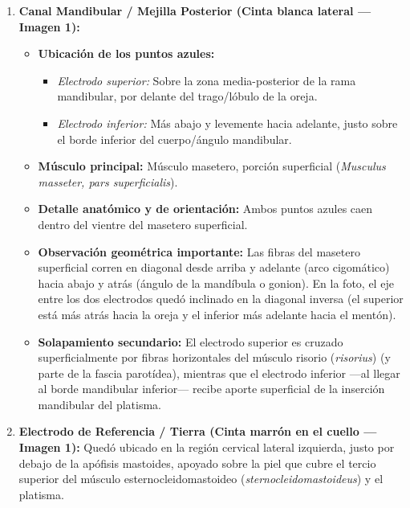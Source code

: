 \documentclass[11pt,a4paper]{article}
\begin{document}
\begin{enumerate}
    \item \textbf{Canal Mandibular / Mejilla Posterior (Cinta blanca lateral — Imagen 1):}
    \begin{itemize}
        \item \textbf{Ubicación de los puntos azules:}
        \begin{itemize}
            \item \textit{Electrodo superior:} Sobre la zona media-posterior de la rama mandibular, por delante del trago/lóbulo de la oreja.
            \item \textit{Electrodo inferior:} Más abajo y levemente hacia adelante, justo sobre el borde inferior del cuerpo/ángulo mandibular.
        \end{itemize}
        \item \textbf{Músculo principal:} Músculo masetero, porción superficial (\textit{Musculus masseter, pars superficialis}).
        \item \textbf{Detalle anatómico y de orientación:} Ambos puntos azules caen dentro del vientre del masetero superficial.
        \item \textbf{Observación geométrica importante:} Las fibras del masetero superficial corren en diagonal desde arriba y adelante (arco cigomático) hacia abajo y atrás (ángulo de la mandíbula o gonion). En la foto, el eje entre los dos electrodos quedó inclinado en la diagonal inversa (el superior está más atrás hacia la oreja y el inferior más adelante hacia el mentón).
        \item \textbf{Solapamiento secundario:} El electrodo superior es cruzado superficialmente por fibras horizontales del músculo risorio (\textit{risorius}) (y parte de la fascia parotídea), mientras que el electrodo inferior —al llegar al borde mandibular inferior— recibe aporte superficial de la inserción mandibular del platisma.
    \end{itemize}

    \item \textbf{Electrodo de Referencia / Tierra (Cinta marrón en el cuello — Imagen 1):}
    Quedó ubicado en la región cervical lateral izquierda, justo por debajo de la apófisis mastoides, apoyado sobre la piel que cubre el tercio superior del músculo esternocleidomastoideo (\textit{sternocleidomastoideus}) y el platisma.
\end{enumerate}
\end{document}
